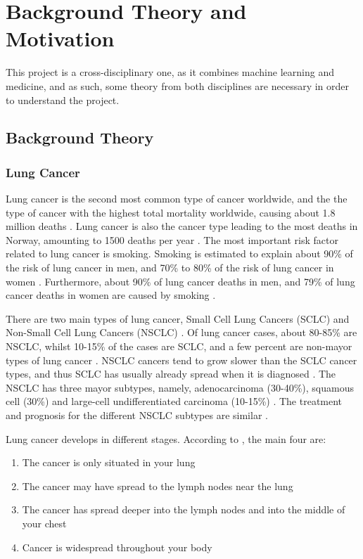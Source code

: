 \chapter{Background Theory and Motivation}\label{T-B}
\label{cha:TheoryAndBackground}

This project is a cross-disciplinary one, as it combines machine learning and medicine, and as such, some theory from both disciplines are necessary in order to understand the project.

\section{Background Theory}
\label{sec:no1}

\subsection{Lung Cancer}
\label{subsec:lung_cancer}

Lung cancer is the second most common type of cancer worldwide, and the the type of cancer with the highest total mortality worldwide, causing about 1.8 million deaths \citep{globalkreftforekomst}. Lung cancer is also the cancer type leading to the most deaths in Norway, amounting to 1500 deaths per year \citep{kreftnorge}. The most important risk factor related to lung cancer is smoking. Smoking is estimated to explain about 90\% of the risk of lung cancer in men, and 70\% to 80\% of the risk of lung cancer in women \citep{roykingrisiko}. Furthermore, about 90\% of lung cancer deaths in men, and 79\% of lung cancer deaths in women are caused by smoking \citep{roykingdod}.

There are two main types of lung cancer, Small Cell Lung Cancers (SCLC) and Non-Small Cell Lung Cancers (NSCLC) \citep{nsclcvsclc}. Of lung cancer cases, about 80-85\% are NSCLC, whilst 10-15\% of the cases are SCLC, and a few percent are non-mayor types of lung cancer \citep{nsclcvsclc2}. NSCLC cancers tend to grow slower than the SCLC cancer types, and thus SCLC has usually already spread when it is diagnosed \citep{nsclcvsclc2}. The NSCLC has three mayor subtypes, namely, adenocarcinoma (30-40\%), squamous cell (30\%) and large-cell undifferentiated carcinoma (10-15\%) \citep{nsclcvsclc}. The treatment and prognosis for the different NSCLC subtypes are similar \citep{nsclcvsclc2}.

Lung cancer develops in different stages. According to \citet{cancerstages}, the main four are:
\begin{enumerate}
    \item The cancer is only situated in your lung
    \item The cancer may have spread to the lymph nodes near the lung
    \item The cancer has spread deeper into the lymph nodes and into the middle of your chest
    \item Cancer is widespread throughout your body
\end{enumerate}

